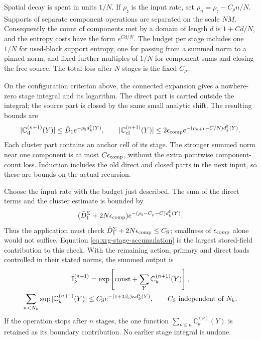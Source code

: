 \documentclass[11pt,letterpaper,reqno]{amsart}
\theoremstyle{definition}
\theoremstyle{remark}
\begin{document}
Spatial decay is spent in units \(1/N\).
If \(\rho_\natural\) is the input rate, set
\(\rho_n=\rho_\natural-C_\rho n/N\).
Supports of separate component operations are
separated on the scale \(NM\).
Consequently the count of components met by
a domain of length \(d\) is \(1+Cd/N\),
and the entropy costs have the form
\(e^{Cd/N}\). The budget per stage includes
one \(1/N\) for used-block support entropy,
one for passing from a summed norm to a
pinned norm, and fixed further multiples
of \(1/N\) for component sums and closing
the free source. The total loss after \(N\)
stages is the fixed \(C_\rho\).

On the configuration criterion above, the
connected expansion gives a nowhere-zero
stage integral and its logarithm. The
direct part is carried outside the integral;
the source part is closed by the same
small analytic shift. The resulting bounds
are
\[
 |\mathbb C_{\rm d}^{(n+1)}(Y)|
       \le\bar D_1e^{-\rho_\natural d_k^\natural(Y)},\qquad
 |\mathbb C_{\rm cl}^{(n+1)}(Y)|
       \le2\epsilon_{\rm comp}
              e^{-(\rho_{n+1}-C/N)d_k^\natural(Y)}.
\]
Each cluster part contains an anchor cell
of its stage. The stronger summed norm
near one component is at most
\(C\epsilon_{\rm comp}\), without the
extra pointwise component-count loss.
Induction includes the old direct and
closed parts in the next input, so these
are bounds on the actual recursion.

Choose the input rate with the budget
just described. The sum of the direct terms and
the cluster estimate is bounded by
\[
 (\bar D_1^\Sigma+2N\epsilon_{\rm comp})
       e^{-(\rho_\natural-C_\rho-C)d_k^\natural(Y)}.
\]
Thus the application must check
\(\bar D_1^\Sigma+2N\epsilon_{\rm comp}\le C_{\rm S}\);
smallness of \(\epsilon_{\rm comp}\) alone would
not suffice. Equation \eqref{eq:xrg-stage-accumulation}
is the largest stored-field contribution to this
check. With the remaining action, primary and
direct loads controlled in their stated norms,
the summed output is
\begin{equation}\label{eq:xrg-stage-logarithms}
 \begin{gathered}
 \mathbb I_k^{(n+1)}
       =\exp\left[\mathrm{const}
                       +\sum_Y\mathbb C_k^{(n+1)}(Y)\right],\\
 \sum_{n<N_k}\sup|\mathbb C_k^{(n+1)}(Y)|
       \le C_{\rm S}
               e^{-(1+3\beta_{\mathrm s})\kappa d_k^\natural(Y)},
 \qquad C_{\rm S}\text{ independent of }N_k .
 \end{gathered}
\end{equation}
If the operation stops after \(n\) stages,
the one function
\(\sum_{\nu\le n}\mathbb C_k^{(\nu)}(Y)\)
is retained as its boundary contribution.
No earlier stage integral is undone.
\end{document}
